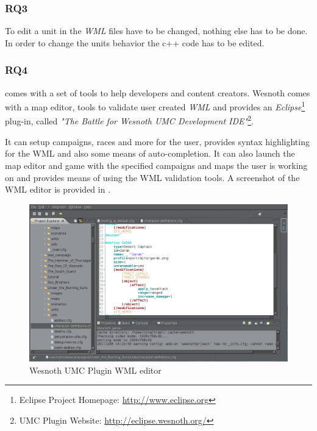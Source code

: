 \subsubsection{RQ3}
To edit a unit in \BOW{} the \textit{WML} files have to be changed, nothing else has to be done. In order to change the
units behavior the c++ code has to be edited.

\subsubsection{RQ4}
\BOW{} comes with a set of tools to help developers and content creators. Wesnoth comes with a  map editor, tools to
validate user created \textit{WML} and provides an \textit{Eclipse}\footnote{Eclipse Project Homepage:
\url{http://www.eclipse.org}} plug-in, called \textit{"The Battle for Wesnoth UMC Development IDE"}\footnote{UMC Plugin
Website: \url{http://eclipse.wesnoth.org/}}.

It can setup
campaigns, races and more for the user, provides syntax highlighting for the WML and also some means of auto-completion. 
It can also launch the map editor and game with the specified campaigns and maps the user is working on and provides
means of using the WML validation tools. A screenshot of the WML editor is provided in .

\begin{figure}[H]
    \centering
    \includegraphics[width=\textwidth]{pics/wesnothumc}
    \caption{Wesnoth UMC Plugin WML editor}
    \label{fig:wesnothumc}
\end{figure}



